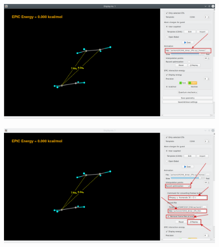\documentclass[a4paper,10pt]{article}
\begin{document}
\begin{minipage}{.5\linewidth}
\begin{figure}[H]
\caption{\label{fig:61}}
\begin{center}
\includegraphics[width=0.95\linewidth]{damqt_QS_fig61_b.png}
\end{center}
\end{figure} 
\end{minipage}
\begin{minipage}{.5\linewidth}
\begin{figure}[H]
\caption{\label{fig:62}}
\begin{center}
\includegraphics[width=0.95\linewidth]{damqt_QS_fig62_b.png}
\end{center}
\end{figure} 
\end{minipage}

\end{document}

